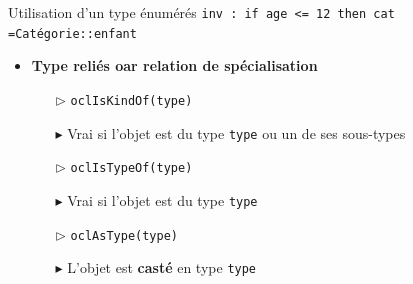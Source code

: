 \documentclass[16pt]{report}
\begin{document}
\begin{multicols*}{2}
        \begin{EExample}{Utilisation d'un type énumérés}{}
            \texttt{inv : if age <= 12 then cat =\textcolor{myb}{Catégorie::enfant}}  
        \end{EExample}


        \begin{itemize}
            \item \textbf{Type reliés oar relation de spécialisation}  
            \begin{itemize}
                \item[$\rhd$] \texttt{\textcolor{myb}{oclIsKindOf(type)}}  
                \item[$\blacktriangleright$] Vrai si l'objet est du type \texttt{\textcolor{myb}{type}} ou un de 
                    ses sous-types 
                \item[$\rhd$] \textcolor{myb}{\texttt{oclIsTypeOf(type)}} 
                \item[$\blacktriangleright$] Vrai si l'objet est du type \textcolor{myb}{\texttt{type}} 
                \item[$\rhd$] \textcolor{myb}{\texttt{oclAsType(type)}}
                \item[$\blacktriangleright$] L'objet est \textbf{casté} en type \textcolor{myb}{\texttt{type}}    

            \end{itemize}

        \end{itemize}



\end{multicols*}
\end{document}
